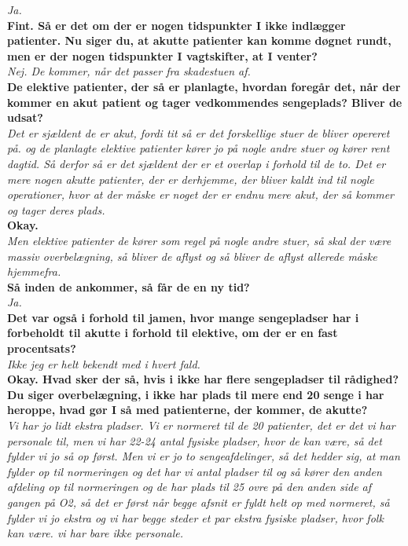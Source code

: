 \noindent
\textit{Ja.} \\
\noindent
\textbf{Fint. Så er det om der er nogen tidspunkter I ikke indlægger patienter. Nu siger du, at akutte patienter kan komme døgnet rundt, men er der nogen tidspunkter I vagtskifter, at I venter?} \\
\noindent
\textit{Nej. De kommer, når det passer fra skadestuen af.} \\
\noindent
\textbf{De elektive patienter, der så er planlagte, hvordan foregår det, når der kommer en akut patient og tager vedkommendes sengeplads? Bliver de udsat?} \\
\noindent
\textit{Det er sjældent de er akut, fordi tit så er det forskellige stuer de bliver opereret på. og de planlagte elektive patienter kører jo på nogle andre stuer og kører rent dagtid. Så derfor så er det sjældent der er et overlap i forhold til de to. Det er mere nogen akutte patienter, der er derhjemme, der bliver kaldt ind til nogle operationer, hvor at der måske er noget der er endnu mere akut, der så kommer og tager deres plads.} \\
\noindent
\textbf{Okay.} \\
\noindent
\textit{Men elektive patienter de kører som regel på nogle andre stuer, så skal der være massiv overbelægning, så bliver de aflyst og så bliver de aflyst allerede måske hjemmefra.} \\
\noindent
\textbf{Så inden de ankommer, så får de en ny tid?} \\
\noindent
\textit{Ja.} \\
\noindent
\textbf{Det var også i forhold til jamen, hvor mange sengepladser har i forbeholdt til akutte i forhold til elektive, om der er en fast procentsats?} \\
\noindent
\textit{Ikke jeg er helt bekendt med i hvert fald.} \\
\noindent
\textbf{Okay. Hvad sker der så, hvis i ikke har flere sengepladser til rådighed? Du siger overbelægning, i ikke har plads til mere end 20 senge i har heroppe, hvad gør I så med patienterne, der kommer, de akutte?} \\
\noindent
\textit{Vi har jo lidt ekstra pladser. Vi er normeret til de 20 patienter, det er det vi har personale til, men vi har 22-24 antal fysiske pladser, hvor de kan være, så det fylder vi jo så op først. Men vi er jo to sengeafdelinger, så det hedder sig, at man fylder op til normeringen og det har vi antal pladser til og så kører den anden afdeling op til normeringen og de har plads til 25 ovre på den anden side af gangen på O2, så det er først når begge afsnit er fyldt helt op med normeret, så fylder vi jo ekstra og vi har begge steder et par ekstra fysiske pladser, hvor folk kan være. vi har bare ikke personale.} \\
